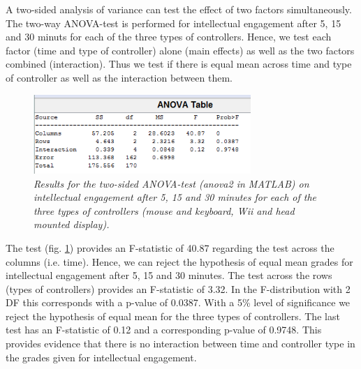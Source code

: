 A two-sided analysis of variance can test the effect of two factors simultaneously. The two-way ANOVA-test is performed for intellectual engagement after 5, 15 and 30 minuts for each of the three types of controllers. Hence, we test each factor (time and type of controller) alone (main effects) as well as the two factors combined (interaction). Thus we test if there is equal mean across time and type of controller as well as the interaction between them.

\begin{figure}[h]
	\begin{center}
		\includegraphics[height=3cm]{fig/anova2_testvalue.png}
		\caption{\textit{{\footnotesize Results for the two-sided ANOVA-test (anova2 in MATLAB) on intellectual engagement after 5, 15 and 30 minutes for each of the three types of controllers (mouse and keyboard, Wii and head mounted display).}}}
		\label{ANOVA_2}
	\end{center}
\end{figure}

The test (fig. \ref{ANOVA_2}) provides an F-statistic of 40.87 regarding the test across the columns (i.e. time). Hence, we can reject the hypothesis of equal mean grades for intellectual engagement after 5, 15 and 30 minutes. The test across the rows (types of controllers) provides an F-statistic of 3.32. In the F-distribution with 2 DF this corresponds with a p-value of 0.0387. With a 5\% level of significance we reject the hypothesis of equal mean for the three types of controllers. The last test has an F-statistic of 0.12 and a corresponding p-value of 0.9748. This provides evidence that there is no interaction between time and controller type in the grades given for intellectual engagement.